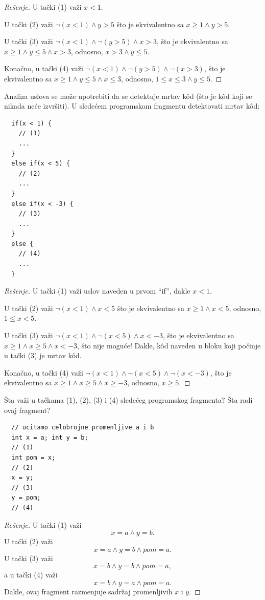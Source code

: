 \begin{proof}[Re\v senje]
  U ta\v cki (1) va\v zi $x < 1$.
  
  U ta\v cki (2) va\v zi $\lnot(x < 1) \land y > 5$ \v sto je ekvivalentno sa $x \ge 1 \land y > 5$.

  U ta\v cki (3) va\v zi $\lnot(x < 1) \land \lnot(y > 5) \land x > 3$, \v sto je ekvivalentno sa
  $x \ge 1 \land y \le 5 \land x > 3$, odnosno, $x > 3 \land y \le 5$.
  
  Kona\v cno, u ta\v cki (4)
  va\v zi $\lnot(x < 1) \land \lnot(y > 5) \land \lnot(x > 3)$, \v sto je ekvivalentno sa
  $x \ge 1 \land y \le 5 \land x \le 3$, odnosno, $1 \le x \le 3 \land y \le 5$.
\end{proof}


\begin{EX}
  Analiza uslova se mo\v ze upotrebiti da se detektuje mrtav k\^od (\v sto je k\^od koji se nikada
  ne\'ce izvr\v siti). U slede\'cem programskom fragmentu detektovati mrtav k\^od:
{\small
\begin{verbatim}
  if(x < 1) {
    // (1)
    ...
  }
  else if(x < 5) {
    // (2)
    ...
  }
  else if(x < -3) {
    // (3)
    ...
  }
  else {
    // (4)
    ...
  }
\end{verbatim}
}
\end{EX}
\begin{proof}[Re\v senje]
  U ta\v cki (1) va\v zi uslov naveden u prvom \enquote{if}, dakle $x < 1$.
  
  U ta\v cki (2) va\v zi $\lnot(x < 1) \land x < 5$ \v sto je ekvivalentno sa $x \ge 1 \land x < 5$,
  odnosno, $1 \le x < 5$.
  
  U ta\v cki (3) va\v zi
  $\lnot(x < 1) \land \lnot(x < 5) \land x < -3$, \v sto je ekvivalentno sa
  $x \ge 1 \land x \ge 5 \land x < -3$, \v sto nije mogu\'ce! Dakle, k\^od naveden u bloku koji po\v cinje u
  ta\v cki (3) je mrtav k\^od.
  
  Kona\v cno, u ta\v cki (4)
  va\v zi $\lnot(x < 1) \land \lnot(x < 5) \land \lnot(x < -3)$, \v sto je ekvivalentno sa
  $x \ge 1 \land x \ge 5 \land x \ge -3$, odnosno, $x \ge 5$.
\end{proof}

\begin{EX}\label{ft03.ex.swap}
  \v Sta va\v zi u ta\v ckama (1), (2), (3) i (4) slede\'ceg programskog fragmenta?
  \v Sta radi ovaj fragment?
\end{EX}
{\small
\begin{verbatim}
  // ucitamo celobrojne promenljive a i b
  int x = a; int y = b;
  // (1)
  int pom = x;
  // (2)
  x = y;
  // (3)
  y = pom;
  // (4)
\end{verbatim}
}
\begin{proof}[Re\v senje]
  U ta\v cki (1) va\v zi
  $$
    x = a \land y = b.
  $$
  U ta\v cki (2) va\v zi
  $$
    x = a \land y = b \land \mathit{pom} = a.
  $$
  U ta\v cki (3) va\v zi
  $$
    x = b \land y = b \land \mathit{pom} = a,
  $$
  a u ta\v cki (4) va\v zi
  $$
    x = b \land y = a \land \mathit{pom} = a.
  $$
  Dakle, ovaj fragment razmenjuje sadr\v zaj promenljivih $x$ i $y$.
\end{proof}

